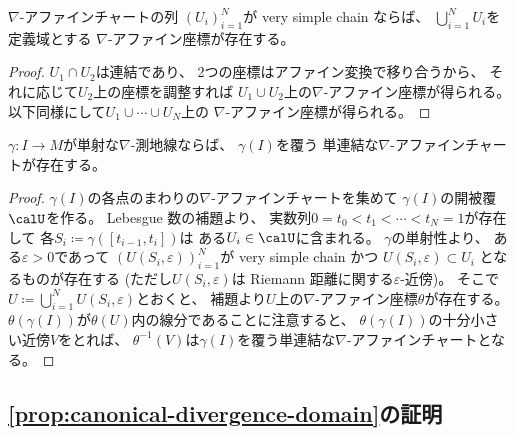 \documentclass[report]{jlreq}
\begin{document}
\begin{lemma}
    $\nabla$-アファインチャートの列
    $(U_i)_{i = 1}^N$が
    very simple chain ならば、
    $\textstyle \bigcup_{i = 1}^N U_i$を定義域とする
    $\nabla$-アファイン座標が存在する。
\end{lemma}

\begin{proof}
    $U_1 \cap U_2$は連結であり、
    2つの座標はアファイン変換で移り合うから、
    それに応じて$U_2$上の座標を調整すれば
    $U_1 \cup U_2$上の$\nabla$-アファイン座標が得られる。
    以下同様にして$U_1 \cup \cdots \cup U_N$上の
    $\nabla$-アファイン座標が得られる。
\end{proof}

\begin{proposition}
    $\gamma \colon I \to M$が単射な$\nabla$-測地線ならば、
    $\gamma(I)$を覆う
    単連結な$\nabla$-アファインチャートが存在する。
\end{proposition}

\begin{proof}
    $\gamma(I)$の各点のまわりの$\nabla$-アファインチャートを集めて
    $\gamma(I)$の開被覆$\calU$を作る。
    Lebesgue 数の補題より、
    実数列$0 = t_0 < t_1 < \cdots < t_N = 1$が存在して
    各$S_i \coloneqq \gamma([t_{i - 1}, t_i])$は
    ある$U_i \in \calU$に含まれる。
    $\gamma$の単射性より、
    ある$\varepsilon > 0$であって
    $(U(S_i, \varepsilon))_{i = 1}^N$が
    very simple chain かつ
    $U(S_i, \varepsilon) \subset U_i$
    となるものが存在する
    (ただし$U(S_i, \varepsilon)$は Riemann 距離に関する$\varepsilon$-近傍)。
    そこで$\textstyle U \coloneqq \bigcup_{i = 1}^N U(S_i, \varepsilon)$とおくと、
    補題より$U$上の$\nabla$-アファイン座標$\theta$が存在する。
    $\theta(\gamma(I))$が$\theta(U)$内の線分であることに注意すると、
    $\theta(\gamma(I))$の十分小さい近傍$V$をとれば、
    $\theta^{-1}(V)$は$\gamma(I)$を覆う単連結な$\nabla$-アファインチャートとなる。
\end{proof}

\subsection{\cref{prop:canonical-divergence-domain}の証明}
\end{document}
